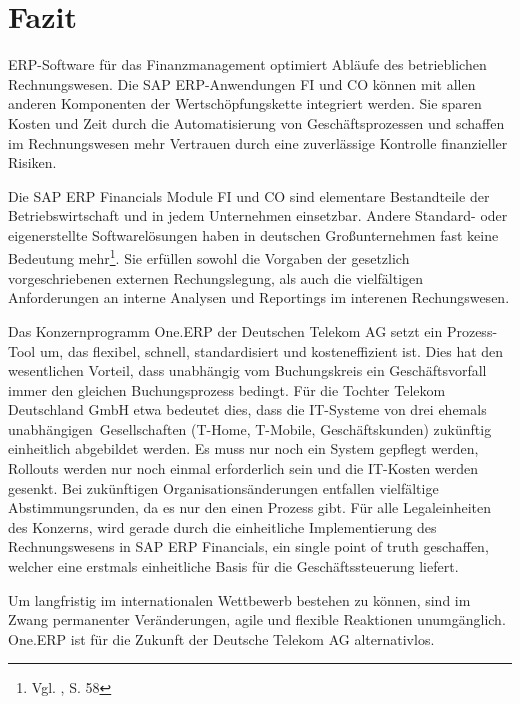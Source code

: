 \section{Fazit}
ERP-Software für das Finanzmanagement optimiert Abläufe des betrieblichen Rechnungswesen. Die SAP ERP-Anwendungen FI und CO können mit allen anderen Komponenten der Wertschöpfungskette integriert werden. Sie sparen Kosten und Zeit durch die Automatisierung von Geschäftsprozessen und schaffen im Rechnungswesen mehr Vertrauen durch eine zuverlässige Kontrolle finanzieller Risiken. 

Die SAP ERP Financials Module FI und CO sind elementare Bestandteile der Betriebswirtschaft und in jedem Unternehmen einsetzbar. Andere  Standard- oder eigenerstellte Softwarelösungen haben in deutschen Großunternehmen fast keine Bedeutung mehr\footnote{Vgl. \cite{Gleich2010}, S. 58}. Sie erfüllen sowohl die Vorgaben der gesetzlich vorgeschriebenen externen Rechungslegung, als auch die vielfältigen Anforderungen an interne Analysen und Reportings im interenen Rechungswesen. 

Das Konzernprogramm One.ERP der Deutschen Telekom AG setzt ein Prozess-Tool um, das flexibel, schnell, standardisiert und kosteneffizient ist. Dies hat den wesentlichen Vorteil, dass unabhängig vom Buchungskreis ein Geschäftsvorfall immer den gleichen Buchungsprozess bedingt. Für die Tochter Telekom Deutschland GmbH etwa bedeutet dies, dass die IT-Systeme von drei ehemals \glqq unabhängigen\grqq \ Gesellschaften (T-Home, T-Mobile, Geschäftskunden) zukünftig einheitlich abgebildet werden. Es muss nur noch ein System gepflegt werden, Rollouts werden nur noch einmal erforderlich sein und die IT-Kosten werden gesenkt. Bei zukünftigen Organisationsänderungen entfallen vielfältige Abstimmungsrunden, da es nur den einen Prozess gibt. Für alle Legaleinheiten des Konzerns, wird gerade durch die einheitliche Implementierung des Rechnungswesens in SAP ERP Financials, ein single point of truth geschaffen, welcher eine erstmals einheitliche Basis für die Geschäftssteuerung liefert.

Um langfristig im internationalen Wettbewerb bestehen zu können, sind im Zwang permanenter Veränderungen, agile und flexible Reaktionen unumgänglich. One.ERP ist für die Zukunft der Deutsche Telekom AG alternativlos.